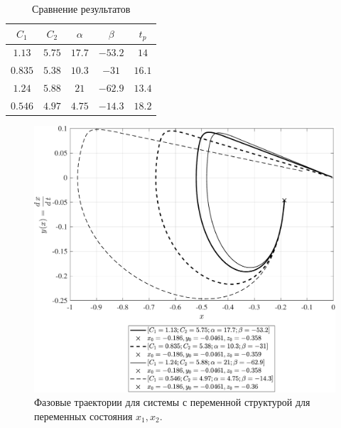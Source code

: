 \begin{table}[!h] \centering
    \caption{Сравнение результатов} \label{tab:tab_VSS_3}
    \begin{tabular}{|c|c|c|c|c|}
        \hline
        $C_1$ & $C_2$ & $\alpha$ & $\beta$ & $t_p$ \\ \hline
         $1.13$ & $5.75$ & $17.7$ & $-53.2$ & $14$ \\ \hline
         $0.835$ & $5.38$ & $10.3$ & $-31$ & $16.1$ \\ \hline
         $1.24$ & $5.88$ & $21$ & $-62.9$ & $13.4$ \\ \hline
         $0.546$ & $4.97$ & $4.75$ & $-14.3$ & $18.2$ \\ \hline
    \end{tabular}
\end{table}
\begin{figure}[!h]\centering
\includegraphics[width=1.0\linewidth]{images/VSS_P_ft_VSS_P_2}
\caption{ Фазовые траектории для системы с переменной структурой для переменных состояния $x_1,x_2$.}\label{fig:VSS_P_ft_VSS_P_2}
\end{figure}
